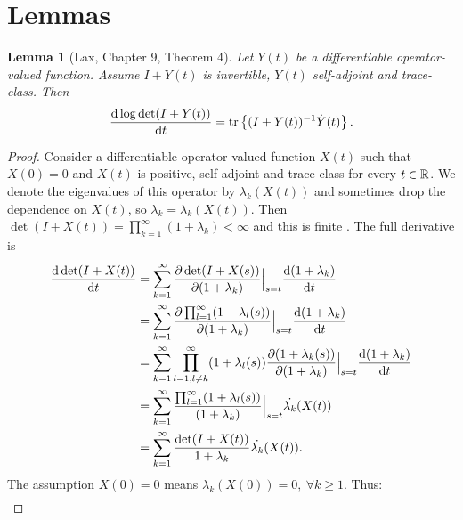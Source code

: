 \documentclass{article}
\newtheorem{lemma}{Lemma}
\begin{document}
\section{Lemmas}






\begin{lemma}[Lax, Chapter 9, Theorem 4\cite{Lax07}]\label{lemma:lax}
  Let $Y(t)$ be a differentiable operator-valued function. Assume 
  $I+Y(t)$ is invertible, $Y(t)$ self-adjoint and trace-class. Then
  \begin{equation*}
    \frac{\text{\textup{d}} \log \det (I+Y(t))}{\text{\textup{d}} t} = \textup{tr}\left \{(I+Y(t))^{-1} \dot{Y}(t) \right \}.
  \end{equation*}
\end{lemma}

\begin{proof}
  Consider a differentiable operator-valued function $X(t)$ such that
  $X(0) = 0$ and $X(t)$ is positive, self-adjoint and trace-class for
  every $t\in \mathbb{R}$. We denote the eigenvalues of this operator by
  $\lambda_k(X(t))$ and sometimes drop the dependence on $X(t)$, so
  $\lambda_k = \lambda_k(X(t))$.  Then $\det (I+X(t)) =
  \prod_{k=1}^{\infty} (1+\lambda_k) < \infty$ and this is finite
  \cite{AlexanderianGloorGhattas14}. The full derivative
  is \begin{align*} \frac{\text{\textup{d}} \det (I+X(t))}{\text{\textup{d}} t}
    &= \sum_{k=1}^{\infty} 
    \frac{\partial \det (I+X(s))}{\partial (1+\lambda_k)}\Big |_{s=t}
    \frac{\text{\textup{d}} (1+\lambda_k)}{\text{\textup{d}} t} \\
    &= \sum_{k=1}^{\infty} \frac{\partial \prod_{l=1}^{\infty}
      (1+\lambda_l(s))}{\partial (1+\lambda_k)}\Big |_{s=t}
    \frac{\text{\textup{d}} (1+\lambda_k)}{\text{\textup{d}} t} \\
    &= \sum_{k=1}^{\infty} \prod_{l=1, l\neq k}^{\infty}
      (1+\lambda_l(s)) \frac{\partial (1+\lambda_k(s))}{\partial (1+\lambda_k)}\Big |_{s=t}
    \frac{\text{\textup{d}} (1+\lambda_k)}{\text{\textup{d}} t} \\
    &= \sum_{k=1}^{\infty} \frac{\prod_{l=1}^{\infty}
      (1+\lambda_l(s))}{(1+\lambda_k)}\Big |_{s=t}
    \dot{\lambda_k}(X(t)) \\
    &= \sum_{k=1}^{\infty} \frac{\det (I+X(t))}{1 +\lambda_k} \dot{\lambda_k}(X(t)).
  \end{align*}
  The assumption $X(0) = 0$ means $\lambda_k(X(0)) = 0,\ \forall k \geq 1$. Thus:
  \begin{align*}

\end{align*}
\end{proof}
\end{document}
